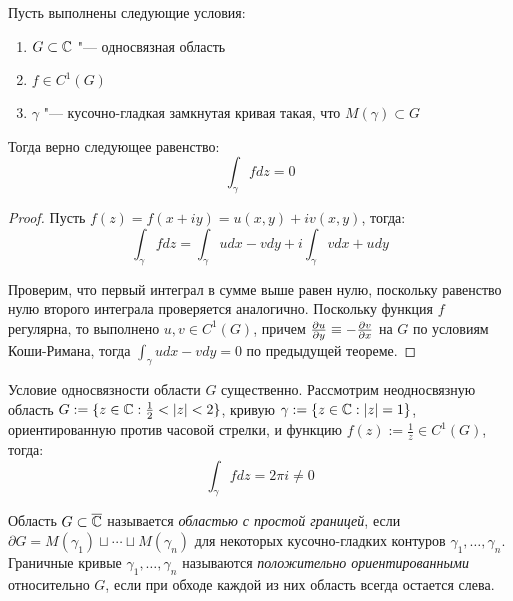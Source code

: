 \begin{theorem}
	Пусть выполнены следующие условия:
	\begin{enumerate}
		\item $G \subset \mathbb{C}$ "--- односвязная область
		\item $f \in C^1(G)$
		\item $\gamma$ "--- кусочно-гладкая замкнутая кривая такая, что $M(\gamma) \subset G$
	\end{enumerate}
	
	Тогда верно следующее равенство:
	\[\int_\gamma fdz = 0\]
\end{theorem}

\begin{proof}
	Пусть $f(z) = f(x + iy) = u(x, y) + iv(x, y)$, тогда:
	\[\int_\gamma fdz = \int_\gamma udx - vdy + i\int_\gamma vdx + udy\]
	
	Проверим, что первый интеграл в сумме выше равен нулю, поскольку равенство нулю второго интеграла проверяется аналогично. Поскольку функция $f$ регулярна, то выполнено $u, v \in C^1(G)$, причем $\frac{\partial u}{\partial y} \equiv -\frac{\partial v}{\partial x}$ на $G$ по условиям Коши-Римана, тогда $\int_\gamma udx - vdy = 0$ по предыдущей теореме.
\end{proof}

\begin{note}
	Условие односвязности области $G$ существенно. Рассмотрим неодносвязную область $G := \{z \in \mathbb{C} : \frac12 < |z| < 2\}$, кривую $\gamma := \{z \in \mathbb{C} : |z| = 1\}$, ориентированную против часовой стрелки, и функцию $f(z) := \frac 1z \in C^1(G)$, тогда:
	\[\int_\gamma fdz = 2\pi i  \ne 0\]
\end{note}

\begin{definition}
	Область $G \subset \overline{\mathbb{C}}$ называется \textit{областью с простой границей}, если $\partial{G} = M(\gamma_1) \sqcup \dotsb \sqcup M(\gamma_n)$ для некоторых кусочно-гладких контуров $\gamma_1, \dotsc, \gamma_n$. Граничные кривые $\gamma_1, \dotsc, \gamma_n$ называются \textit{положительно ориентированными} относительно $G$, если при обходе каждой из них область всегда остается слева.
\end{definition}

